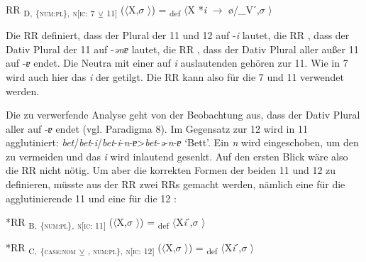 \begin{exe}
 RR \textsubscript{D,} \textsubscript{\{\textsc{num:pl}\},} \textsubscript{\textsc{n[}\textsc{ic:} 7} \textsubscript{\tiny $\veebar$}\textsubscript{ 11]} ($\langle$X,$\sigma$ $\rangle$) = \textsubscript{def} $\langle$X *\textit{i} $\rightarrow$ ø/\_Vˊ,$\sigma$ $\rangle$
\end{exe}

Die RR  definiert, dass der Plural der  11 und 12 auf -\textit{i} lautet, die RR , dass der Dativ Plural der  11 auf -\textit{ənɐ} lautet, die RR , dass der Dativ Plural aller  außer 11 auf -\textit{ɐ} endet. Die Neutra mit einer auf \textit{i} auslautenden  gehören zur  11. Wie in  7 wird auch hier das \textit{i} der  getilgt. Die RR  kann also für die  7 und 11 verwendet werden.

Die zu verwerfende Analyse geht von der Beobachtung aus, dass der Dativ Plural aller  auf -\textit{ɐ} endet (vgl. Paradigma 8). Im Gegensatz zur  12 wird in  11 agglutiniert: \textit{bet}/\textit{bet}-\textit{i}/\textit{bet}-\textit{i}-\textit{n}-\textit{ɐ}>\textit{bet}-\textit{ə}-\textit{n}-\textit{ɐ} ‘Bett’. Ein \textit{n} wird eingeschoben, um den  zu vermeiden und das \textit{i} wird inlautend gesenkt. Auf den ersten Blick wäre also die RR  nicht nötig. Um aber die korrekten Formen der beiden  11 und 12 zu definieren, müsste aus der RR  zwei RRs gemacht werden, nämlich eine für die agglutinierende  11  und eine für die  12 :

\ea%
\label{ex:key:65}
 *RR \textsubscript{B,} \textsubscript{\{\textsc{num:pl}\},} \textsubscript{\textsc{n[}\textsc{ic:} 11]} ($\langle$X,$\sigma$ $\rangle$) = \textsubscript{def} $\langle$X\textit{i}ˊ,$\sigma$ $\rangle$
\z

\ea%
\label{ex:key:66}
 *RR \textsubscript{C,} \textsubscript{\{\textsc{case:nom}} \textsubscript{\tiny $\veebar$}\textsubscript{ \AKK, \textsc{num:pl}\},} \textsubscript{\textsc{n[}\textsc{ic:} 12]} ($\langle$X,$\sigma$ $\rangle$) = \textsubscript{def} $\langle$X\textit{i}ˊ,$\sigma$ $\rangle$
\z

